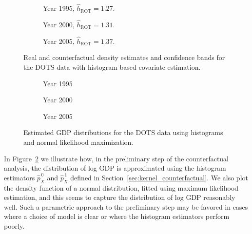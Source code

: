 \documentclass[11pt,lof]{puthesis}
\DeclareMathOperator{\ROT}{ROT}
\theoremstyle{break}
\theoremstyle{proof}
\begin{document}
\begin{figure}[t]
  \centering
  \begin{subfigure}{0.32\textwidth}
    \centering
    \caption{Year 1995, $\hat h_{\ROT} = 1.27$.}
  \end{subfigure}
  \begin{subfigure}{0.32\textwidth}
    \centering
    \caption{Year 2000, $\hat h_{\ROT} = 1.31$.}
  \end{subfigure}
  \begin{subfigure}{0.32\textwidth}
    \centering
    \caption{Year 2005, $\hat h_{\ROT} = 1.37$.}
  \end{subfigure}
  \caption[Histogram-based estimation and inference for the DOTS data]{
    Real and counterfactual density estimates and confidence bands for
  the DOTS data with histogram-based covariate estimation.}
  \label{fig:kernel_trade}
\end{figure}

\begin{figure}[b!]
  \centering
  \begin{subfigure}{0.32\textwidth}
    \centering
    \caption{Year 1995}
  \end{subfigure}
  \begin{subfigure}{0.32\textwidth}
    \centering
    \caption{Year 2000}
  \end{subfigure}
  \begin{subfigure}{0.32\textwidth}
    \centering
    \caption{Year 2005}
  \end{subfigure}
  \caption[Estimated GDP distributions for the DOTS data]{
    Estimated GDP distributions for the DOTS data using histograms and
  normal likelihood maximization.}
  \label{fig:kernel_gdp}
\end{figure}

In Figure~\ref{fig:kernel_gdp} we illustrate how, in the preliminary step of the
counterfactual analysis, the distribution of log GDP is approximated using the
histogram estimators $\hat p_X^{\,0}$ and $\hat p_X^{\,1}$ defined in
Section~\ref{sec:kernel_counterfactual}. We also plot the density function of a
normal distribution, fitted using maximum likelihood estimation, and this seems
to capture the distribution of log GDP reasonably well. Such a parametric
approach to the preliminary step may be favored in cases where a choice of
model is clear or where the histogram estimators perform poorly.
\end{document}
